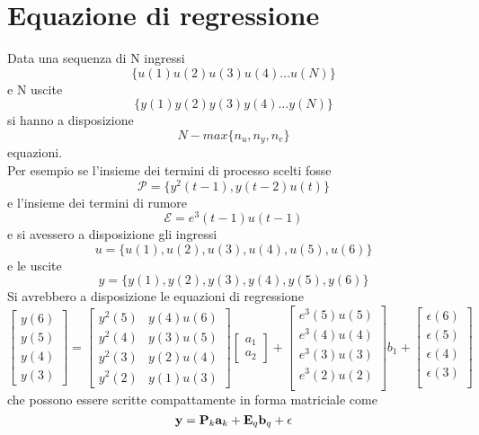 \section{Equazione di regressione}
Data una sequenza di N ingressi
\begin{equation}
\{u(1) u(2) u(3) u(4) \dots u(N )\}
\end{equation}
e N uscite
\begin{equation}
\{y(1) y(2) y(3) y(4) \dots y(N )\}
\end{equation}
si hanno a disposizione
\begin{equation}
N-max\{n_u , n_y , n_e \}
\end{equation}
equazioni.\\
Per esempio se l’insieme dei termini di processo scelti fosse
\begin{equation}
\mathcal{P} = \{y^2(t - 1), y(t - 2)u(t)\}
\end{equation}
e l’insieme dei termini di rumore
\begin{equation}
\mathcal{E}= {e^3 (t - 1)u(t - 1)}
\end{equation}
e si avessero a disposizione gli ingressi
\begin{equation}
u = \{u(1), u(2), u(3), u(4), u(5), u(6)\} 
\end{equation}
e le uscite
\begin{equation}
y = \{y(1), y(2), y(3), y(4), y(5), y(6)\}
\end{equation}
Si avrebbero a disposizione le equazioni di regressione
\begin{equation}
\begin{bmatrix}
y(6) \\ 
y(5) \\ 
y(4) \\ 
y(3)
\end{bmatrix}=
\begin{bmatrix}
y^2(5) & y(4)u(6) \\ 
y^2(4) & y(3)u(5)\\ 
y^2(3)& y(2)u(4) \\ 
y^2(2)& y(1)u(3)
\end{bmatrix}
\begin{bmatrix}
a_1 \\ a_2 
\end{bmatrix}+
\begin{bmatrix}
e^3(5)u(5) \\ 
e^3(4)u(4) \\  
e^3(3)u(3) \\  
e^3(2)u(2) \\ 
\end{bmatrix}b_1+
\begin{bmatrix}
\epsilon(6) \\ 
\epsilon(5) \\
\epsilon(4) \\
\epsilon(3) \\
\end{bmatrix}
\end{equation}
che possono essere scritte compattamente in forma matriciale come
\begin{equation}
\textbf{y}=\textbf{P}_k\textbf{a}_k+\textbf{E}_q\textbf{b}_q+\epsilon
\end{equation}

